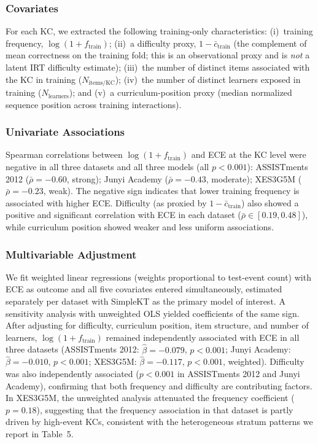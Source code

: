 \subsubsection*{Covariates}
For each KC, we extracted the following training-only characteristics: (i)~training frequency, $\log(1 + f_{\text{train}})$; (ii)~a difficulty proxy, $1 - \bar{c}_{\text{train}}$ (the complement of mean correctness on the training fold; this is an observational proxy and is \emph{not} a latent IRT difficulty estimate); (iii)~the number of distinct items associated with the KC in training ($N_{\text{items/KC}}$); (iv)~the number of distinct learners exposed in training ($N_{\text{learners}}$); and (v)~a curriculum-position proxy (median normalized sequence position across training interactions).

\subsubsection*{Univariate Associations}
Spearman correlations between $\log(1 + f_{\text{train}})$ and ECE at the KC level were negative in all three datasets and all three models (all $p < 0.001$): ASSISTments 2012 ($\bar{\rho} = -0.60$, strong); Junyi Academy ($\bar{\rho} = -0.43$, moderate); XES3G5M ($\bar{\rho} = -0.23$, weak). The negative sign indicates that lower training frequency is associated with higher ECE. Difficulty (as proxied by $1 - \bar{c}_{\text{train}}$) also showed a positive and significant correlation with ECE in each dataset ($\bar{\rho} \in [0.19, 0.48]$), while curriculum position showed weaker and less uniform associations.

\subsubsection*{Multivariable Adjustment}
We fit weighted linear regressions (weights proportional to test-event count) with ECE as outcome and all five covariates entered simultaneously, estimated separately per dataset with SimpleKT as the primary model of interest. A sensitivity analysis with unweighted OLS yielded coefficients of the same sign. After adjusting for difficulty, curriculum position, item structure, and number of learners, $\log(1 + f_{\text{train}})$ remained independently associated with ECE in all three datasets (ASSISTments 2012: $\hat{\beta} = -0.079$, $p < 0.001$; Junyi Academy: $\hat{\beta} = -0.010$, $p < 0.001$; XES3G5M: $\hat{\beta} = -0.117$, $p < 0.001$, weighted). Difficulty was also independently associated ($p < 0.001$ in ASSISTments 2012 and Junyi Academy), confirming that both frequency and difficulty are contributing factors. In XES3G5M, the unweighted analysis attenuated the frequency coefficient ($p = 0.18$), suggesting that the frequency association in that dataset is partly driven by high-event KCs, consistent with the heterogeneous stratum patterns we report in Table~5.

